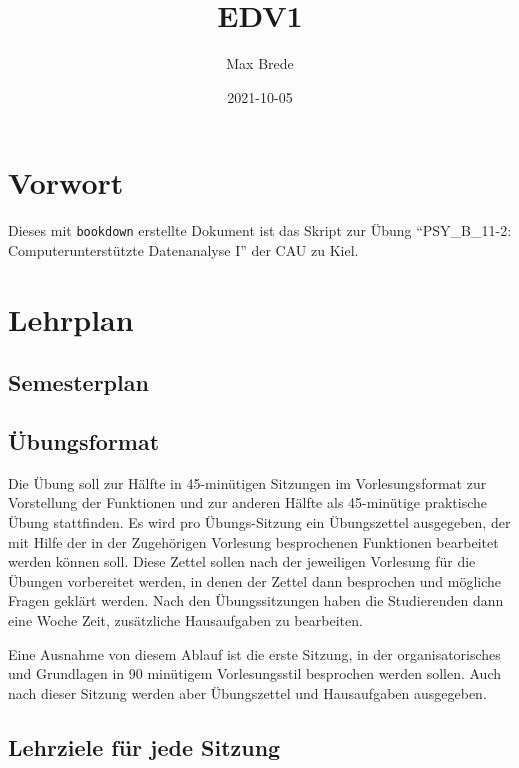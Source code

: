 \documentclass[
]{book}
\title{EDV1}
\author{Max Brede}
\date{2021-10-05}
\begin{document}
\maketitle

{
\setcounter{tocdepth}{1}
\tableofcontents
}
\hypertarget{vorwort}{%
\chapter{Vorwort}\label{vorwort}}

Dieses mit \texttt{bookdown} erstellte Dokument ist das Skript zur Übung ``PSY\_B\_11-2: Computerunterstützte Datenanalyse I'' der CAU zu Kiel.

\hypertarget{lehrplan}{%
\chapter{Lehrplan}\label{lehrplan}}

\hypertarget{semesterplan}{%
\section{Semesterplan}\label{semesterplan}}

\hypertarget{uxfcbungsformat}{%
\section{Übungsformat}\label{uxfcbungsformat}}

Die Übung soll zur Hälfte in 45-minütigen Sitzungen im Vorlesungsformat zur Vorstellung der Funktionen und zur anderen Hälfte als 45-minütige praktische Übung stattfinden.
Es wird pro Übungs-Sitzung ein Übungszettel ausgegeben, der mit Hilfe der in der Zugehörigen Vorlesung besprochenen Funktionen bearbeitet werden können soll.
Diese Zettel sollen nach der jeweiligen Vorlesung für die Übungen vorbereitet werden, in denen der Zettel dann besprochen und mögliche Fragen geklärt werden.
Nach den Übungssitzungen haben die Studierenden dann eine Woche Zeit, zusätzliche Hausaufgaben zu bearbeiten.

Eine Ausnahme von diesem Ablauf ist die erste Sitzung, in der organisatorisches und Grundlagen in 90 minütigem Vorlesungsstil besprochen werden sollen. Auch nach dieser Sitzung werden aber Übungszettel und Hausaufgaben ausgegeben.

\hypertarget{lehrziele-fuxfcr-jede-sitzung}{%
\section{Lehrziele für jede Sitzung}\label{lehrziele-fuxfcr-jede-sitzung}}
\end{document}
